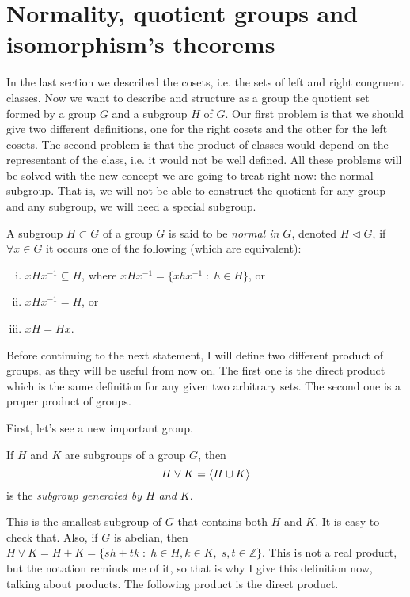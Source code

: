 \documentclass[../main.tex]{subfiles}
\begin{document}
\section{Normality, quotient groups and isomorphism's theorems}

In the last section we described the cosets, i.e. the sets of left and right congruent classes. Now we want to describe and structure as a group the quotient set formed by a group $G$ and a subgroup $H$ of $G$. Our first problem is that we should give two different definitions, one for the right cosets and the other for the left cosets. The second problem is that the product of classes would depend on the representant of the class, i.e. it would not be well defined. All these problems will be solved with the new concept we are going to treat right now: the normal subgroup. That is, we will not be able to construct the quotient for any group and any subgroup, we will need a special subgroup.

\begin{defi}
 A subgroup $H\subset G$ of a group $G$ is said to be \textit{normal in $G$}, denoted $H\vartriangleleft G$, if $\forall x\in G$ it occurs one of the following (which are equivalent):
\begin{enumerate}[(i)]
    \item $xHx^{-1}\subseteq H$, where $xHx^{-1} = \{xhx^{-1}\;:\;h\in H\}$, or
    \item $xHx^{-1} = H$, or
    \item $xH = Hx$.
\end{enumerate}
\end{defi}

Before continuing to the next statement, I will define two different product of groups, as they will be useful from now on. The first one is the direct product which is the same definition for any given two arbitrary sets. The second one is a proper product of groups.

First, let's see a new important group. 

\begin{defi}
If $H$ and $K$ are subgroups of a group $G$, then
\begin{equation}
    \notag
    H\vee K = \langle H\cup K\rangle
\end{equation}
is the \textit{subgroup generated by $H$ and $K$}.
\end{defi}

This is the smallest subgroup of $G$ that contains both $H$ and $K$. It is easy to check that. Also, if $G$ is abelian, then $H\vee K = H+K = \{sh+tk\;:\;h\in H, k\in K,\;s,t\in\mathbb{Z}\}$. This is not a real product, but the notation reminds me of it, so that is why I give this definition now, talking about products. The following product is the direct product.
\end{document}
